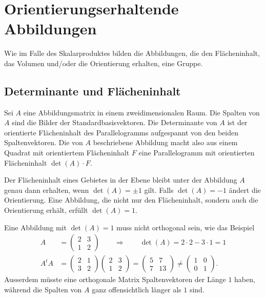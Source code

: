 %
%
% 
\section{Orientierungserhaltende Abbildungen}
Wie im Falle des Skalarproduktes bilden die Abbildungen, die den Flächeninhalt,
das Volumen und/oder die Orientierung erhalten, eine Gruppe.

\subsection{Determinante und Flächeninhalt}
Sei $A$ eine Abbildungsmatrix in einem zweidimensionalen Raum.
Die Spalten von $A$ sind die Bilder der Standardbasisvektoren.
Die Determinante von $A$ ist der orientierte Flächeninhalt des Parallelogramms 
aufgespannt von den beiden Spaltenvektoren.
Die von $A$ beschriebene Abbildung macht also aus einem Quadrat mit
orientiertem Flächeninhalt $F$
eine Parallelogramm mit orientierten Flächeninhalt $\det(A)\cdot F$.

Der Flächeninhalt eines Gebietes in der Ebene bleibt unter der Abbildung
$A$ genau dann erhalten, wenn $\det(A)=\pm 1$ gilt.
Falls $\det(A)=-1$ ändert die Orientierung.
Eine Abbildung, die nicht nur den Flächeninhalt, sondern auch die
Orientierung erhält, erfüllt $\det(A)=1$.

Eine Abbildung mit $\det(A)=1$ muss nicht orthogonal sein, wie das Beispiel
\begin{align*}
A
&=
\begin{pmatrix}2&3\\1&2\end{pmatrix}
\qquad\Rightarrow\qquad
\det(A) = 2\cdot 2-3\cdot 1 =1
\\
A^tA
&=
\begin{pmatrix}2&1\\3&2\end{pmatrix}
\begin{pmatrix}2&3\\1&2\end{pmatrix}
=
\begin{pmatrix}
5&7\\
7&13
\end{pmatrix}
\ne
\begin{pmatrix}
1&0\\
0&1
\end{pmatrix}.
\end{align*}
Ausserdem müsste eine orthogonale Matrix Spaltenvektoren der Länge $1$ haben,
während die Spalten von $A$ ganz offensichtlich länger als $1$ sind.

